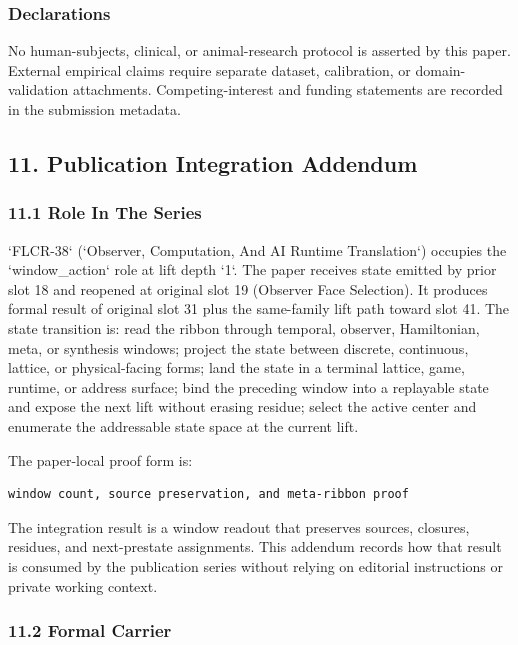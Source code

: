 \documentclass[11pt]{article}
\begin{document}
\subsubsection*{Declarations}

No human-subjects, clinical, or animal-research protocol is asserted by this
paper. External empirical claims require separate dataset, calibration, or
domain-validation attachments. Competing-interest and funding statements are recorded in the submission metadata.

\subsection*{11. Publication Integration Addendum}

\subsubsection*{11.1 Role In The Series}

`FLCR-38` (`Observer, Computation, And AI Runtime Translation`) occupies the `window\_action` role at lift depth `1`.
The paper receives state emitted by prior slot 18 and reopened at original slot 19 (Observer Face Selection). It produces formal result of original slot 31 plus the same-family lift path toward slot 41. The state transition is:
read the ribbon through temporal, observer, Hamiltonian, meta, or synthesis windows; project the state between discrete, continuous, lattice, or physical-facing forms; land the state in a terminal lattice, game, runtime, or address surface; bind the preceding window into a replayable state and expose the next lift without erasing residue; select the active center and enumerate the addressable state space at the current lift.

The paper-local proof form is:

\begin{verbatim}
window count, source preservation, and meta-ribbon proof
\end{verbatim}

The integration result is a window readout that preserves sources, closures, residues, and next-prestate assignments. This addendum records how that result is
consumed by the publication series without relying on editorial instructions or
private working context.

\subsubsection*{11.2 Formal Carrier}
\end{document}
